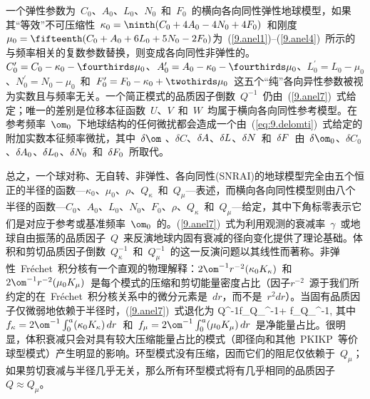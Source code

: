 一个弹性参数为~$C_0$、$A_0$、$L_0$、$N_0$~和~$F_0$~的横向各向同性弹性地球模型，如果其“等效”不可压缩性~$\kappa_0=\ninth(C_0+4A_0-4N_0+4F_0)$~和刚度~$\mu_0=\fifteenth(C_0+A_0+6L_0+5N_0-2F_0)$为~(\ref{9.anel1})--(\ref{9.anel4})~所示的与频率相关的复数参数替换，则变成各向同性非弹性的。$C_0^{\prime}=C_0-\kappa_0-\fourthirds\mu_0$、$A_0^{\prime}=A_0-\kappa_0-\fourthirds\mu_0$、$L_0^{\prime}=L_0-\mu_0$、$N_0^{\prime}=N_0-\mu_0$~和~$F_0^{\prime}=F_0-\kappa_0+\twothirds\mu_0$~这五个“纯”各向异性参数被视为实数且与频率无关。一个简正模式的品质因子倒数~$Q^{-1}$~仍由~(\ref{9.anel7})~式给定；唯一的差别是位移本征函数~$U$、$V$~和~$W$~均属于横向各向同性参考模型。在参考频率~$\om_0$~下地球结构的任何微扰都会造成一个由~(\ref{eq:9.delomti})~式给定的附加实数本征频率微扰，其中~$\delta\om$
、$\delta C$、$\delta\hspace{-0.2 mm}A$、$\delta\hspace{-0.1 mm}L$、$\delta\hspace{-0.1 mm}N$~和~$\delta\hspace{-0.1 mm}F$~由~$\delta\om_0$、$\delta C_0$、$\delta\hspace{-0.2 mm}A_0$、$\delta\hspace{-0.1 mm}L_0$、$\delta\hspace{-0.1 mm}N_0$~和~$\delta\hspace{-0.1 mm}F_0$~所取代。

总之，一个球对称、无自转、非弹性、各向同性(SNRAI)的地球模型完全由五个恒正的半径的函数---$\kappa_0$、$\mu_0$、$\rho$、$Q_{\kappa}$~和~$Q_{\mu}$---表述，而横向各向同性模型则由八个半径的函数---$C_0$、$A_0$、$L_0$、$N_0$、$F_0$、$\rho$、$Q_{\kappa}$~和~$Q_{\mu}$---给定，其中下角标零表示它们是对应于参考或基准频率~$\om_0$~的。(\ref{9.anel7})~式为利用观测的衰减率~$\gamma$~或地球自由振荡的品质因子~$Q$~来反演地球内固有衰减的径向变化提供了理论基础。体积和剪切品质因子倒数~$Q_{\kappa}^{-1}$~和~$Q_{\mu}^{-1}$~的这一反演问题以其线性而著称。非弹性~Fr\'{e}chet~积分核有一个直观的物理解释：$2\om^{-1}r^{-2}(\kappa_0K_{\kappa})$~和~$2\om^{-1}r^{-2}(\mu_0K_{\mu})$~是每个模式的压缩和剪切能量密度占比（因子$r^{-2}$~源于我们所约定的在~Fr\'{e}chet~积分核关系中的微分元素是~$dr$，而不是~$r^2dr$）。当固有品质因子仅微弱地依赖于半径时，(\ref{9.anel7})~式退化为
\eq
Q^{-1}\approx f_{\kappa}Q_{\kappa}^{-1}+
f_{\mu}Q_{\mu}^{-1},
\en
其中~$f_{\kappa}=2\om^{-1}\int_0^a(\kappa_0K_{\kappa})\,dr$~和~$f_{\mu}=2\om^{-1}\int_0^a(\mu_0K_{\mu})\,dr$~是净能量占比。很明显，体积衰减只会对具有较大压缩能量占比的模式（即径向和其他~PKIKP~等价球型模式）产生明显的影响。环型模式没有压缩，因而它们的阻尼仅依赖于~$Q_{\mu}$；如果剪切衰减与半径几乎无关，那么所有环型模式将有几乎相同的品质因子~$Q\approx Q_{\mu}$。

